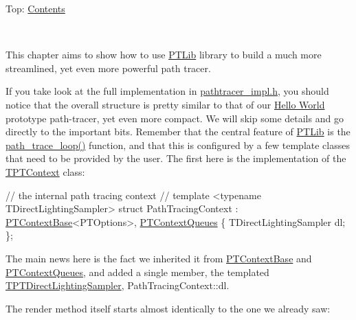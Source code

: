 Top\+: \hyperlink{_overture_contents_page}{Contents}

 ~\newline
\begin{DoxyParagraph}{}
This chapter aims to show how to use \hyperlink{group___p_t_lib}{P\+T\+Lib} library to build a much more streamlined, yet even more powerful path tracer. 
\end{DoxyParagraph}
\begin{DoxyParagraph}{}
If you take look at the full implementation in \hyperlink{_p_t_page_code}{pathtracer\+\_\+impl.\+h}, you should notice that the overall structure is pretty similar to that of our \hyperlink{_hello_renderer_page}{Hello World} prototype path-\/tracer, yet even more compact. We will skip some details and go directly to the important bits. Remember that the central feature of \hyperlink{group___p_t_lib}{P\+T\+Lib} is the \hyperlink{_p_t_lib_page_path_trace_loop_anchor}{path\+\_\+trace\+\_\+loop()} function, and that this is configured by a few template classes that need to be provided by the user. The first here is the implementation of the \hyperlink{_p_t_lib_page_TPTContext}{T\+P\+T\+Context} class\+: ~\newline

\begin{DoxyCodeInclude}
    \textcolor{comment}{// the internal path tracing context}
    \textcolor{comment}{//}
    \textcolor{keyword}{template} <\textcolor{keyword}{typename} TDirectLightingSampler>
    \textcolor{keyword}{struct }PathTracingContext : \hyperlink{struct_p_t_context_base}{PTContextBase}<PTOptions>, 
      \hyperlink{struct_p_t_context_queues}{PTContextQueues}
    \{
        TDirectLightingSampler dl;
    \};
\end{DoxyCodeInclude}
 
\end{DoxyParagraph}
\begin{DoxyParagraph}{}
The main news here is the fact we inherited it from \hyperlink{struct_p_t_context_base}{P\+T\+Context\+Base} and \hyperlink{struct_p_t_context_queues}{P\+T\+Context\+Queues}, and added a single member, the templated \hyperlink{_p_t_lib_page_TPTDirectLightingSampler}{T\+P\+T\+Direct\+Lighting\+Sampler}, Path\+Tracing\+Context\+::dl.
\end{DoxyParagraph}
\begin{DoxyParagraph}{}
The render method itself starts almost identically to the one we already saw\+:
\end{DoxyParagraph}

